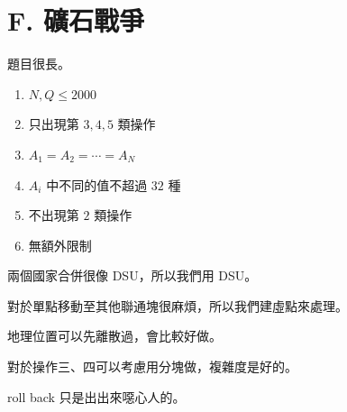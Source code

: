 \section{F. 礦石戰爭}

\begin{frame}{}
    題目很長。
\end{frame}

\begin{frame}{}
    \begin{enumerate}
        \item{$N, Q \le 2000$}
        \item{只出現第 $3, 4, 5$ 類操作}
        \item{$A_1 = A_2 = \cdots = A_N$}
        \item{$A_i$ 中不同的值不超過 $32$ 種}
        \item{不出現第 $2$ 類操作}
        \item{無額外限制}
    \end{enumerate}
\end{frame}

\begin{frame}{}
    兩個國家合併很像 DSU，所以我們用 DSU。

    對於單點移動至其他聯通塊很麻煩，所以我們建虛點來處理。

    地理位置可以先離散過，會比較好做。

    對於操作三、四可以考慮用分塊做，複雜度是好的。

    roll back 只是出出來噁心人的。
\end{frame}
